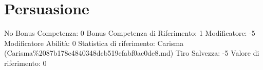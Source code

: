 \section{Persuasione}\label{persuasione}

\begin{description}
\tightlist
\item[Tags: ABI]
No Bonus Competenza: 0 Bonus Competenza di Riferimento: 1 Modificatore:
-5 Modificatore Abilità: 0 Statistica di riferimento: Carisma
(Carisma\%2087b178c4840348dcb519efabf0ac0de8.md) Tiro Salvezza: -5
Valore di riferimento: 0
\end{description}
